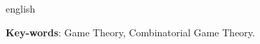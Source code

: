 \begin{resumo}[Abstract]
 \begin{otherlanguage*}{english}


   \vspace{\onelineskip}

   \noindent
   \textbf{Key-words}: Game Theory, Combinatorial Game Theory.
 \end{otherlanguage*}
\end{resumo}
